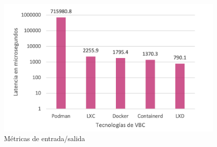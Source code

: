 \begin{figure}[H]
    \centering
    \includegraphics[width=\textwidth] {tablas-images/cp4/io.png}
    \caption{Métricas de entrada/salida}\label{fig:tabla-metricas-io}
\end{figure}